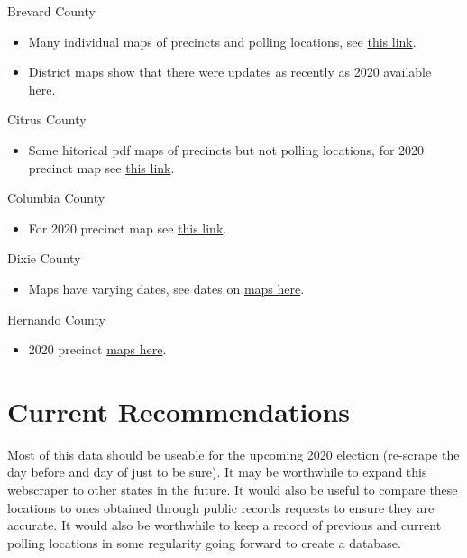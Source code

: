 \documentclass[12pt]{article}
\begin{document}
Brevard County
\begin{itemize}
  \item Many individual maps of precincts and polling locations, see \href{https://www.votebrevard.com/m/Maps/Precinct-Maps-Copy}{this link}.
  \item District maps show that there were updates as recently as 2020 \href{https://www.votebrevard.com/m/Maps/District-Maps}{available here}.
\end{itemize}
Citrus County
\begin{itemize}
  \item Some hitorical pdf maps of precincts but not polling locations, for 2020 precinct map see \href{https://www.votecitrus.com/Portals/Citrus/Pct%20map%20February%20Layout_2.pdf?ver=2020-04-28-200823-073}{this link}.
\end{itemize}
Columbia County
\begin{itemize}
  \item For 2020 precinct map see \href{https://www.votecolumbia.com/Portals/Columbia/Documents/SOE_Prec2019.pdf?ver=2020-06-29-135723-083}{this link}.
\end{itemize}
Dixie County
\begin{itemize}
  \item Maps have varying dates, see dates on \href{https://www.duvalelections.com/Voter-Information/Maps/Precinct-Maps}{maps here}.
\end{itemize}
Hernando County
\begin{itemize}
  \item 2020 precinct \href{https://www.hernandovotes.com/Portals/Hernando/Voting%20Precincts062520.pdf?ver=2020-06-26-132804-290}{maps here}.
\end{itemize}



\clearpage



\section{Current Recommendations}
Most of this data should be useable for the upcoming 2020 election (re-scrape the day before and day of just to be sure). It may be worthwhile to expand this webscraper to other states in the future. It would also be useful to compare these locations to ones obtained through public records requests to ensure they are accurate. It would also be worthwhile to keep a record of previous and current polling locations in some regularity going forward to create a database.
\end{document}
